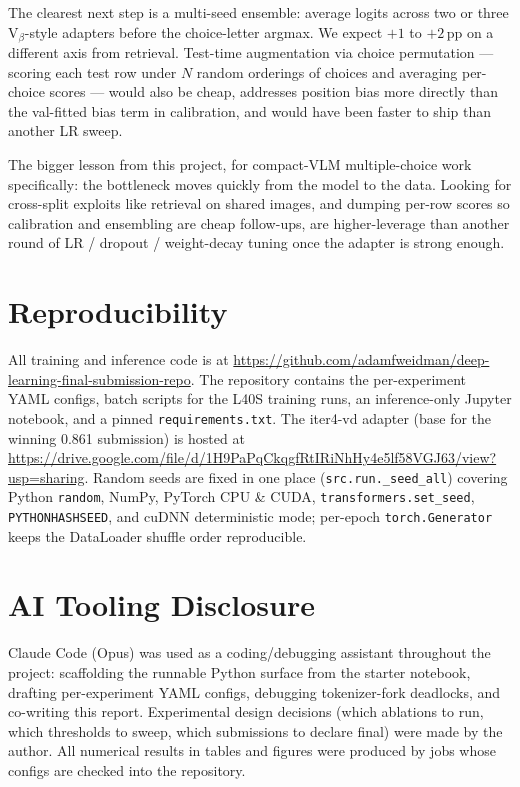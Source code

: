 \documentclass[11pt]{article}
\begin{document}
The clearest next step is a multi-seed ensemble: average logits across two or three V$_\beta$-style adapters before the choice-letter argmax. We expect $+1$ to $+2$\,pp on a different axis from retrieval. Test-time augmentation via choice permutation --- scoring each test row under $N$ random orderings of choices and averaging per-choice scores --- would also be cheap, addresses position bias more directly than the val-fitted bias term in calibration, and would have been faster to ship than another LR sweep.

The bigger lesson from this project, for compact-VLM multiple-choice work specifically: the bottleneck moves quickly from the model to the data. Looking for cross-split exploits like retrieval on shared images, and dumping per-row scores so calibration and ensembling are cheap follow-ups, are higher-leverage than another round of LR / dropout / weight-decay tuning once the adapter is strong enough.

\section*{Reproducibility}

All training and inference code is at \url{https://github.com/adamfweidman/deep-learning-final-submission-repo}. The repository contains the per-experiment YAML configs, batch scripts for the L40S training runs, an inference-only Jupyter notebook, and a pinned \texttt{requirements.txt}. The iter4-vd adapter (base for the winning 0.861 submission) is hosted at \url{https://drive.google.com/file/d/1H9PaPqCkqgfRtIRiNhHy4e5lf58VGJ63/view?usp=sharing}. Random seeds are fixed in one place (\texttt{src.run.\_seed\_all}) covering Python \texttt{random}, NumPy, PyTorch CPU \& CUDA, \texttt{transformers.set\_seed}, \texttt{PYTHONHASHSEED}, and cuDNN deterministic mode; per-epoch \texttt{torch.Generator} keeps the DataLoader shuffle order reproducible.

\section*{AI Tooling Disclosure}

Claude Code (Opus) was used as a coding/debugging assistant throughout the project: scaffolding the runnable Python surface from the starter notebook, drafting per-experiment YAML configs, debugging tokenizer-fork deadlocks, and co-writing this report. Experimental design decisions (which ablations to run, which thresholds to sweep, which submissions to declare final) were made by the author. All numerical results in tables and figures were produced by jobs whose configs are checked into the repository.
\end{document}

